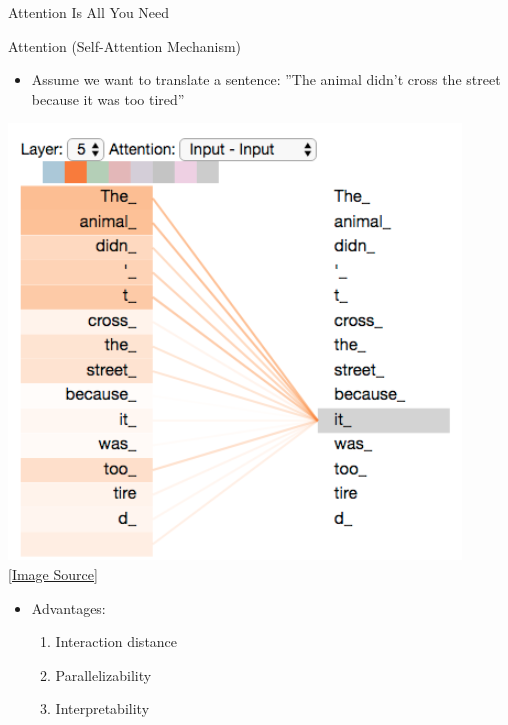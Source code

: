 \begin{frame}[fragile]{Attention Is All You Need \cite{vaswani2017attention}}
\begin{center}
    \end{center}

\end{frame}

\begin{frame}[fragile]{Attention (Self-Attention Mechanism)}

    \begin{itemize}
        \item Assume we want to translate a sentence: ”The animal didn't cross the street because it was too tired”
    \end{itemize}
    \begin{center}
        \includegraphics[scale=0.25]{../images/img_7.png} \\
        \href{https://jalammar.github.io/illustrated-transformer/}{[Image Source]}
    \end{center}
    \begin{itemize}
        \item Advantages:
              \begin{enumerate}
                  \item Interaction distance
                  \item Parallelizability
                  \item Interpretability
              \end{enumerate}
    \end{itemize}

\end{frame}


